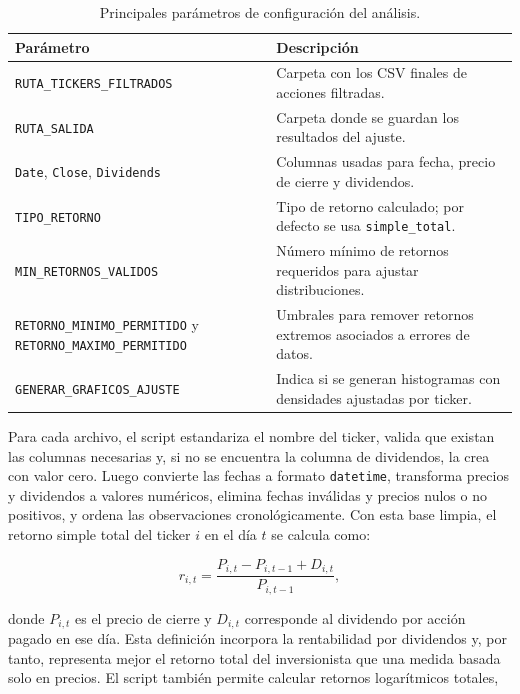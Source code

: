 \begin{table}[h]
\centering
\caption{Principales par\'ametros de configuraci\'on del an\'alisis.}
\label{tab:anexo4_configuracion}
\small
\begin{tabular}{@{}p{}p{}@{}}
\toprule
Par\'ametro & Descripci\'on \\
\midrule
\texttt{RUTA\_TICKERS\_FILTRADOS} & Carpeta con los CSV finales de acciones filtradas. \\
\texttt{RUTA\_SALIDA} & Carpeta donde se guardan los resultados del ajuste. \\
\texttt{Date}, \texttt{Close}, \texttt{Dividends} & Columnas usadas para fecha, precio de cierre y dividendos. \\
\texttt{TIPO\_RETORNO} & Tipo de retorno calculado; por defecto se usa \texttt{simple\_total}. \\
\texttt{MIN\_RETORNOS\_VALIDOS} & N\'umero m\'inimo de retornos requeridos para ajustar distribuciones. \\
\texttt{RETORNO\_MINIMO\_PERMITIDO} y \texttt{RETORNO\_MAXIMO\_PERMITIDO} & Umbrales para remover retornos extremos asociados a errores de datos. \\
\texttt{GENERAR\_GRAFICOS\_AJUSTE} & Indica si se generan histogramas con densidades ajustadas por ticker. \\
\bottomrule
\end{tabular}
\end{table}

Para cada archivo, el script estandariza el nombre del ticker, valida que existan las columnas necesarias y, si no se encuentra la columna de dividendos, la crea con valor cero. Luego convierte las fechas a formato \texttt{datetime}, transforma precios y dividendos a valores num\'ericos, elimina fechas inv\'alidas y precios nulos o no positivos, y ordena las observaciones cronol\'ogicamente. Con esta base limpia, el retorno simple total del ticker $i$ en el d\'ia $t$ se calcula como:

\begin{equation}
r_{i,t} =
\frac{P_{i,t} - P_{i,t-1} + D_{i,t}}{P_{i,t-1}},
\end{equation}

donde $P_{i,t}$ es el precio de cierre y $D_{i,t}$ corresponde al dividendo por acci\'on pagado en ese d\'ia. Esta definici\'on incorpora la rentabilidad por dividendos y, por tanto, representa mejor el retorno total del inversionista que una medida basada solo en precios. El script tambi\'en permite calcular retornos logar\'itmicos totales,

